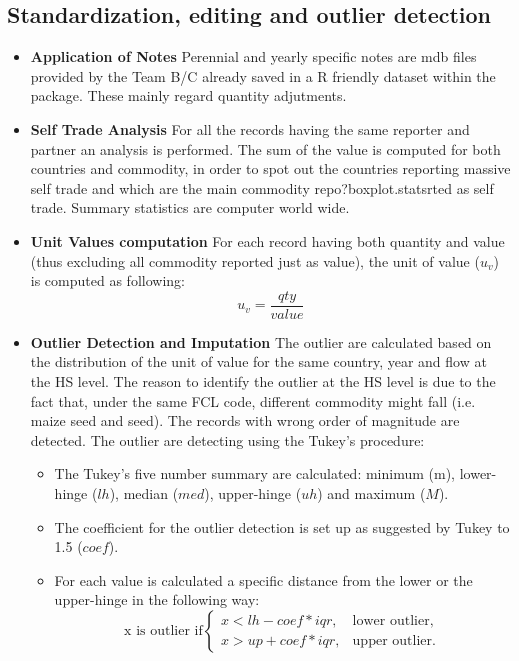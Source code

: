 \documentclass[nojss]{jss}\usepackage[]{graphicx}\usepackage[]{color}
\begin{document}
\subsection{Standardization, editing and outlier detection}
\begin{itemize}
\item {\bf Application of Notes} Perennial and yearly specific notes are mdb files provided by the Team B/C already saved in a R friendly dataset within the package. These mainly regard quantity adjutments.
\item {\bf Self Trade Analysis} For all the records having the same reporter and partner an analysis is performed. The sum of the value is computed for both countries and commodity, in order to spot out the countries reporting massive self trade and which are the main commodity repo?boxplot.statsrted as self trade. Summary statistics are computer world wide.
\item {\bf Unit Values computation} For each record having both quantity and value (thus excluding all commodity reported just as value), the unit of value ($u_v$) is computed as following:
\begin{equation}
u_v = \frac{qty}{value}
\end{equation}
\item {\bf Outlier Detection and Imputation} The outlier are calculated based on the distribution of the unit of value for the same country, year and flow at the HS level. The reason to identify the outlier at the HS level is due to the fact that, under the same FCL code, different commodity might fall (i.e. maize seed and seed). The records with wrong order of magnitude are detected. The outlier are detecting using the Tukey's procedure:
\begin{itemize}
\item The Tukey's five number summary are calculated: minimum (m), lower-hinge ($lh$), median ($med$), upper-hinge ($uh$) and maximum ($M$).
\item The coefficient for the outlier detection is set up as suggested by Tukey to 1.5 ($coef$).
\item For each value is calculated a specific distance from the lower or the upper-hinge in the following way:
\begin{equation}
\text{x is outlier if} \begin{cases}
    x < lh - coef * iqr, & \text{lower outlier},\\
    x > up + coef * iqr, & \text{upper outlier}.
  \end{cases}

\end{equation}
\end{itemize}
\end{itemize}
\end{document}
